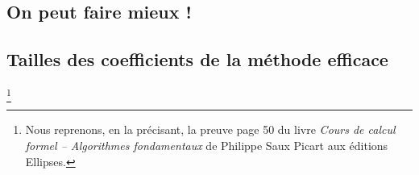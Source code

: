 \subsection{On peut faire mieux !} 







\subsection{Tailles des coefficients de la méthode efficace}%
\footnote{
	Nous reprenons, en la précisant, la preuve page 50 du livre \emph{\og Cours de calcul formel -- Algorithmes fondamentaux \fg} de Philippe Saux Picart aux éditions Ellipses.
}




